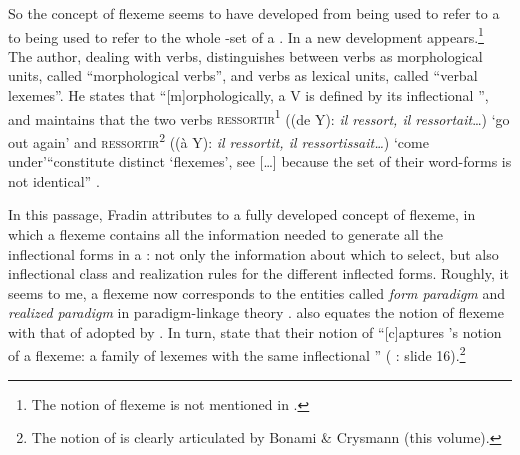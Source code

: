 \documentclass[output=paper]{langsci/langscibook}
\begin{document}
So the concept of flexeme seems to have developed from being used to
refer to a  to being used to refer to the whole -set of a
. In %
\citet{Fradin17} %
 a new development appears.\footnote{The
  notion of flexeme is not mentioned in %
\citet{Fradin09}%
%
.} The
author, dealing with verbs, distinguishes between verbs as morphological
units, called ``morphological verbs'', and verbs as lexical units,
called ``verbal lexemes''. He states that ``[m]orphologically, a V is
defined by its inflectional '', and maintains that the two
 verbs \textsc{ressortir\textsuperscript{1}} ((de Y): \emph{il
ressort, il ressortait}\ldots{}) `go out again' and
\textsc{ressortir\textsuperscript{2}} ((à Y): \emph{il ressortit, il
ressortissait\ldots{}}) `come under'``constitute distinct `flexemes',
see %
\citet{Fradin03b} %
%
{[}\ldots{}{]} because the set of their
word-forms is not identical'' %
\citep[4]{Fradin17}%
.

In this passage, Fradin attributes to \citet{Fradin03b}
a fully
developed concept of flexeme, in which a flexeme contains all the
information needed to generate all the inflectional forms in a :
not only the information about which  to select, but also
inflectional class and realization rules for the different inflected
forms. Roughly, it seems to me, a flexeme now corresponds to the
entities called \emph{form paradigm} and \emph{realized paradigm} in
paradigm-linkage theory %
\citep{Stump16}%
%
. %
\citet{Fradin17} %
%
 also equates
the notion of flexeme with that of  adopted by
%
\citet{Bonami12t}%
%
. In turn, %
\citet{Bonami12t} %
%
 state that
their notion of  ``{[}c{]}aptures 
%
\citet{Fradin03b}%
%
's notion of a flexeme: a family of lexemes with the
same inflectional '' %
(%
\citealt{Bonami12t}%
%
: slide 16).\footnote{The notion of  is clearly articulated  by Bonami \& Crysmann (this volume).}
%
\end{document}
